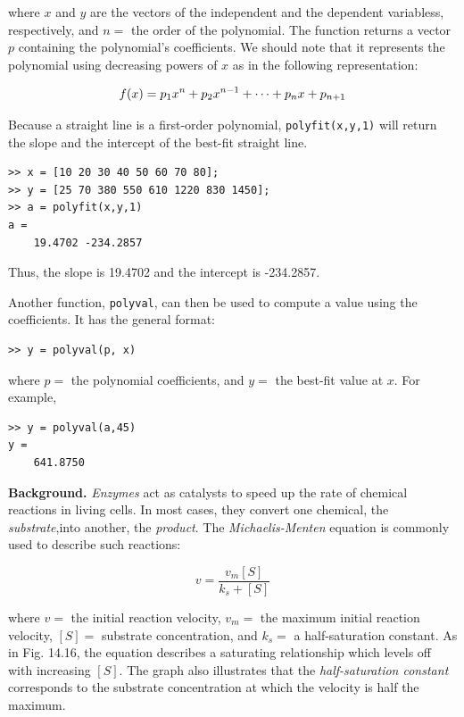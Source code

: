 \documentclass[../main.tex]{subfiles}
\begin{document}
\noindent where $x$ and $y$ are the vectors of the independent and the dependent variabless, respectively, and $n =$ the order of the polynomial. The function returns a vector $p$ containing the polynomial's coefficients. We should note that it represents the polynomial using decreasing powers of $x$ as in the following representation:

\begin{equation}
	\notag
	f(x) = p_1x^n + p_2x^{n-1} + \cdots + p_n x + p_{n + 1}
\end{equation}

Because a straight line is a first-order polynomial, \verb|polyfit(x,y,1)| will return the slope and the intercept of the best-fit straight line.

\begin{lstlisting}[numbers=none]
>> x = [10 20 30 40 50 60 70 80];
>> y = [25 70 380 550 610 1220 830 1450];
>> a = polyfit(x,y,1)
a =
	19.4702 -234.2857
\end{lstlisting}

\noindent Thus, the slope is 19.4702 and the intercept is -234.2857.

Another function, \texttt{polyval}, can then be used to compute a value using the coefficients. It has the general format:

\begin{lstlisting}[numbers=none]
>> y = polyval(p, x)
\end{lstlisting}

\noindent where $p =$ the polynomial coefficients, and $y =$ the best-fit value at $x$. For example,

\begin{lstlisting}[numbers=none]
>> y = polyval(a,45)
y =
	641.8750
\end{lstlisting}

\bigskip

\textbf{Background.} \textit{Enzymes} act as catalysts to speed up the rate of chemical reactions in living cells. In most cases, they convert one chemical, the \textit{substrate},into another, the \textit{product}. The \textit{Michaelis-Menten} equation is commonly used to describe such reactions:

\begin{equation}
	\tag{14.28}
	v = \frac{v_m[S]}{k_s + [S]}
\end{equation}

\noindent where $v =$ the initial reaction velocity, $v_m =$ the maximum initial reaction velocity, $[S] =$ substrate concentration, and $k_s =$ a half-saturation constant. As in Fig. 14.16, the equation describes a saturating relationship which levels off with increasing $[S]$. The graph also illustrates that the \textit{half-saturation constant} corresponds to the substrate concentration at which the velocity is half the maximum.
\end{document}
